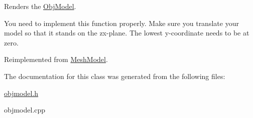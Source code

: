 Renders the \hyperlink{classObjModel}{Obj\-Model}. 

You need to implement this function properly. Make sure you translate your model so that it stands on the zx-\/plane. The lowest y-\/coordinate needs to be at zero. 

Reimplemented from \hyperlink{classMeshModel_a794db0d087fc1810cb3510ef0050ad28}{Mesh\-Model}.



The documentation for this class was generated from the following files\-:\begin{DoxyCompactItemize}
\item 
\hyperlink{objmodel_8h}{objmodel.\-h}\item 
objmodel.\-cpp\end{DoxyCompactItemize}
